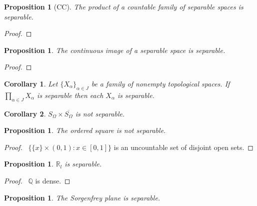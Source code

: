 \documentclass{report}
\let\qed\relax
\newtheorem{prop}[lm]{Proposition}
\newtheorem{cor}{Corollary}[lm]
\theoremstyle{definition}
\begin{document}
  \begin{prop}[CC]
   The product of a countable family of separable spaces is separable.
  \end{prop}

  \begin{proof}
   \pf
   \qed
  \end{proof}

  \begin{prop}
   The continuous image of a separable space is separable.
  \end{prop}

  \begin{proof}
   \pf
   \qed
  \end{proof}

  \begin{cor}
    Let $\{ X_\alpha \}_{\alpha \in J}$ be a family of nonempty topological
    spaces. If $\prod_{\alpha \in J} X_\alpha$ is separable then each
$X_\alpha$ is separable.
  \end{cor}

  \begin{cor}
    $S_\Omega \times \overline{S_\Omega}$ is not separable.
  \end{cor}

 \begin{prop}
  The ordered square is not separable.
 \end{prop}

 \begin{proof}
   \pf\ $\{ \{x\} \times (0,1) : x \in [0,1] \}$ is an uncountable set of
disjoint open sets. \qed
 \end{proof}

  \begin{prop}
   $\mathbb{R}_l$ is separable.
 \end{prop}

 \begin{proof}
   \pf\ $\mathbb{Q}$ is dense. \qed
 \end{proof}

  \begin{prop}
  The Sorgenfrey plane is separable.
 \end{prop}
\end{document}
